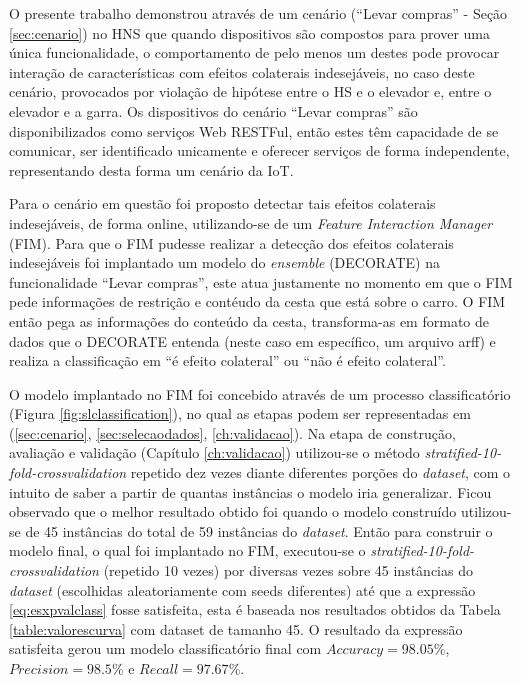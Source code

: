 O presente trabalho demonstrou através de um cenário (``Levar compras'' - Seção \ref{sec:cenario}) no HNS que quando dispositivos são compostos para prover uma única funcionalidade, o comportamento de pelo menos um destes pode provocar interação de características com efeitos colaterais indesejáveis, no caso deste cenário, provocados por violação de hipótese entre o HS e o elevador e, entre o elevador e a garra. Os dispositivos do cenário ``Levar compras'' são disponibilizados como serviços Web RESTFul, então estes têm capacidade de se comunicar, ser identificado unicamente e oferecer serviços de forma independente, representando desta forma um cenário da IoT.

Para o cenário em questão foi proposto detectar tais efeitos colaterais indesejáveis, de forma online, utilizando-se de um \textit{Feature Interaction Manager} (FIM). Para que o FIM pudesse realizar a detecção dos efeitos colaterais indesejáveis foi implantado um modelo do \textit{ensemble} (DECORATE) na funcionalidade ``Levar compras'', este atua justamente no momento em que o FIM pede informações de restrição e contéudo da cesta que está sobre o carro. O FIM então pega as informações do conteúdo da cesta, transforma-as em formato de dados que o DECORATE entenda (neste caso em específico, um arquivo arff) e realiza a classificação em ``é efeito colateral'' ou ``não é efeito colateral''. 

O modelo implantado no FIM foi concebido através de um processo classificatório (Figura \ref{fig:slclassification}), no qual as etapas podem ser representadas em (\ref{sec:cenario}, \ref{sec:selecaodados}, \ref{ch:validacao}). Na etapa de construção, avaliação e validação (Capítulo \ref{ch:validacao}) utilizou-se o método \textit{stratified-10-fold-crossvalidation} repetido dez vezes diante diferentes porções do \textit{dataset}, com o intuito de saber a partir de quantas instâncias o modelo iria generalizar. Ficou observado que o melhor resultado obtido foi quando o modelo construído utilizou-se de 45 instâncias do total de 59 instâncias do \textit{dataset}. Então para construir o modelo final, o qual foi  implantado no FIM, executou-se o \textit{stratified-10-fold-crossvalidation} (repetido 10 vezes) por diversas vezes sobre 45 instâncias do \textit{dataset} (escolhidas aleatoriamente com seeds diferentes) até que a expressão \ref{eq:esxpvalclass} fosse satisfeita, esta é baseada nos resultados obtidos da Tabela \ref{table:valorescurva} com dataset de tamanho 45. O resultado da expressão satisfeita gerou um modelo classificatório final com $\textit{Accuracy}=98.05\%$, $\textit{Precision}=98.5\%$ e $\textit{Recall}=97.67\%$.

